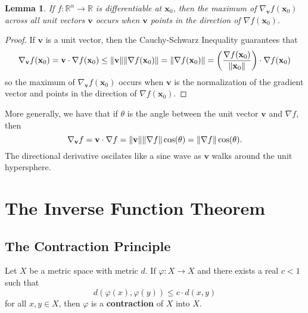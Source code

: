 \documentclass[11pt]{article}
\renewcommand{\vec}[1]{\mathbf{#1}}
\renewcommand{\grad}{\nabla}
\newtheorem*{lemma*}{Lemma}
\begin{document}
\begin{adjustwidth}{0.5cm}{}
	\begin{lemma*}
		If $f: \mathbb{R}^{n} \to \mathbb{R}$ is differentiable at $\vec{x}_{0}$, then the maximum of $\grad_{\vec{v}} f(\vec{x}_{0})$ across all unit vectors $\vec{v}$ occurs when $\vec{v}$ points in the direction of $\grad f(\vec{x}_{0})$.
	\end{lemma*}
    \begin{proof}\renewcommand{\qedsymbol}{}
		If $\vec{v}$ is a unit vector, then the Cauchy-Schwarz Inequality guarantees that
		\[
			\grad_{\vec{v}} f(\vec{x}_{0}) = \vec{v} \cdot \grad f(\vec{x}_{0}) \le \norm{\vec{v}} \norm{\grad f (\vec{x}_{0})} = \norm{\grad f(\vec{x}_{0})} = \left( \frac{\grad f(\vec{x}_{0})}{\norm{\vec{x}_{0}}} \right) \cdot \grad f (\vec{x}_{0})
		\]
		so the maximum of $\grad_{\vec{v}} f(\vec{x}_{0})$ occurs when $\vec{v}$ is the normalization of the gradient vector and points in the direction of $\grad f (\vec{x}_{0})$.
	\end{proof}
\end{adjustwidth}

More generally, we have that if $\theta$ is the angle between the unit vector $\vec{v}$ and $\grad f$, then 
\[
	\grad_{\vec{v}} f = \vec{v} \cdot \grad f = \norm{\vec{v}} \norm{\grad f} \cos(\theta) = \norm{\grad f} \cos(\theta).
\]
The directional derivative oscilates like a sine wave as $\vec{v}$ walks around the unit hypersphere.


\section{The Inverse Function Theorem}


\subsection{The Contraction Principle}

Let $X$ be a metric space with metric $d$. If $\varphi : X \to X$ and there exists a real $c < 1$ such that
\[
	d(\varphi(x), \varphi(y)) \le c \cdot d(x, y)
\]
for all $x, y \in X$, then $\varphi$ is a \textbf{contraction} of $X$ into $X$.
\end{document}
